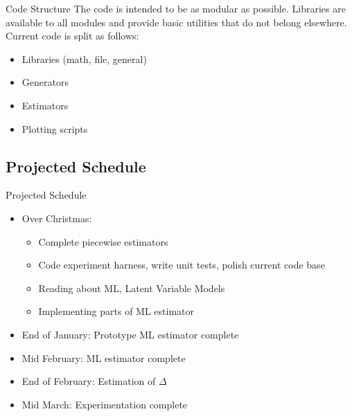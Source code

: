 \documentclass{beamer}
\begin{document}
\begin{frame}{Code Structure}
    The code is intended to be as modular as possible. Libraries are available to all modules and provide basic utilities that do not belong elsewhere. Current code is split as follows:
    \begin{itemize}
    \item Libraries (math, file, general)
    \item Generators
    \item Estimators
    \item Plotting scripts
    \end{itemize}
\end{frame}

\subsection{Projected Schedule}

\begin{frame}{Projected Schedule}
  \begin{itemize}
  \item  Over Christmas: 
    \begin{itemize}
    \item Complete piecewise estimators
    \item Code experiment harness, write unit tests, polish current code base
    \item Reading about ML, Latent Variable Models
    \item Implementing parts of ML estimator
    \end{itemize}
  \item End of January: Prototype ML estimator complete
  \item Mid February: ML estimator complete
  \item End of February: Estimation of $\Delta$
  \item Mid March: Experimentation complete
  \end{itemize}
\end{frame}
\end{document}
